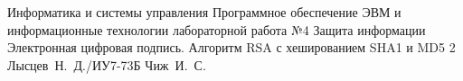 \documentclass{bmstu}
\begin{document}
\makereporttitle
{Информатика и системы управления} %
{Программное обеспечение ЭВМ и информационные технологии}
{лабораторной работа №4} %
{Защита информации} %
{Электронная цифровая подпись. Алгоритм
	RSA с хешированием SHA1 и MD5} %
{2} %
{Лысцев~Н.~Д./ИУ7-73Б} %
{Чиж~И.~С.} %
{}

\maketableofcontents







\makebibliography
\end{document}
